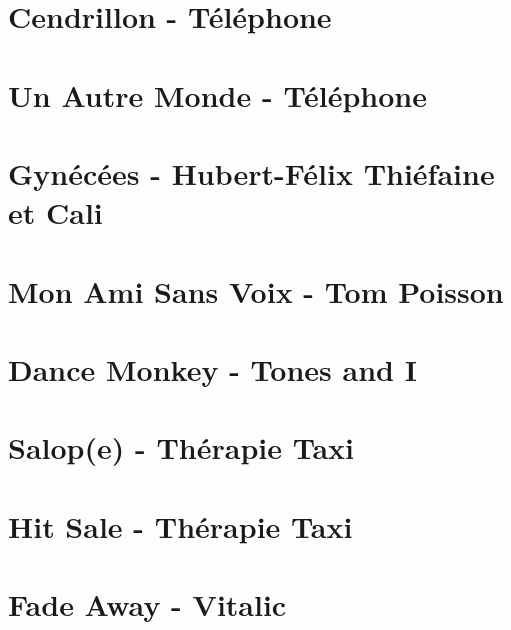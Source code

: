 \documentclass[11pt]{article}
\begin{document}
\section{Cendrillon - Téléphone}
\begin{guitar}

\end{guitar}

\section*{Un Autre Monde - Téléphone}

\section{Gynécées - Hubert-Félix Thiéfaine et Cali}
\begin{guitar}

\end{guitar}


\section{Mon Ami Sans Voix - Tom Poisson}
\begin{guitar}

\end{guitar}



\section{Dance Monkey - Tones and I}
\begin{guitar}

\end{guitar}

\section{Salop(e) - Thérapie Taxi}
\begin{guitar}

\end{guitar}

\section{Hit Sale - Thérapie Taxi}
\begin{guitar}

\end{guitar}

\section{Fade Away - Vitalic}

\end{document}
